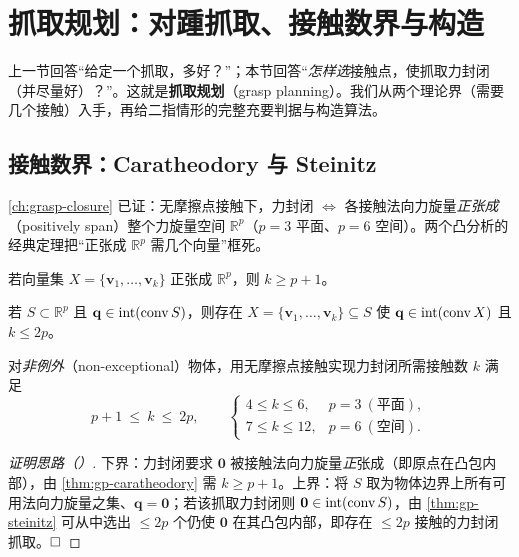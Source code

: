\section{抓取规划：对踵抓取、接触数界与构造}
\label{sec:gp-planning}

上一节回答“给定一个抓取，多好？”；本节回答“\emph{怎样选}接触点，使抓取力封闭（并尽量好）？”。这就是\textbf{抓取规划}（grasp planning）。我们从两个理论界（需要几个接触）入手，再给二指情形的完整充要判据与构造算法。

\subsection{接触数界：Caratheodory 与 Steinitz}
\cref{ch:grasp-closure} 已证：无摩擦点接触下，力封闭 $\iff$ 各接触法向力旋量\emph{正张成}（positively span）整个力旋量空间 $\mathbb{R}^p$（$p=3$ 平面、$p=6$ 空间）。两个凸分析的经典定理把“正张成 $\mathbb{R}^p$ 需几个向量”框死。

\begin{theorem}\label{thm:gp-caratheodory}
若向量集 $X=\{\mathbf{v}_1,\dots,\mathbf{v}_k\}$ 正张成 $\mathbb{R}^p$，则 $k\ge p+1$。
\end{theorem}

\begin{theorem}\label{thm:gp-steinitz}
若 $S\subset\mathbb{R}^p$ 且 $\mathbf{q}\in\operatorname{int}(\operatorname{conv} S)$，则存在 $X=\{\mathbf{v}_1,\dots,\mathbf{v}_k\}\subseteq S$ 使 $\mathbf{q}\in\operatorname{int}(\operatorname{conv} X)$ 且 $k\le 2p$。
\end{theorem}

\begin{proposition}[无摩擦点接触的力封闭接触数界]\label{prop:gp-contact-bounds}
对\emph{非例外}（non-exceptional）物体，用无摩擦点接触实现力封闭所需接触数 $k$ 满足
\begin{equation}
  p+1\ \le\ k\ \le\ 2p,\qquad
  \begin{cases}
    4\le k\le 6, & p=3\ (\text{平面}),\\
    7\le k\le 12, & p=6\ (\text{空间}).
  \end{cases}
  \label{eq:gp-bounds}
\end{equation}
\end{proposition}
\begin{proof}[证明思路（\cite{murray1994mathematical}）]
下界：力封闭要求 $\mathbf{0}$ 被接触法向力旋量\emph{正}张成（即原点在凸包内部），由 \cref{thm:gp-caratheodory} 需 $k\ge p+1$。上界：将 $S$ 取为物体边界上所有可用法向力旋量之集、$\mathbf{q}=\mathbf{0}$；若该抓取力封闭则 $\mathbf{0}\in\operatorname{int}(\operatorname{conv} S)$，由 \cref{thm:gp-steinitz} 可从中选出 $\le 2p$ 个仍使 $\mathbf{0}$ 在其凸包内部，即存在 $\le 2p$ 接触的力封闭抓取。$\hfill\square$
\end{proof}

